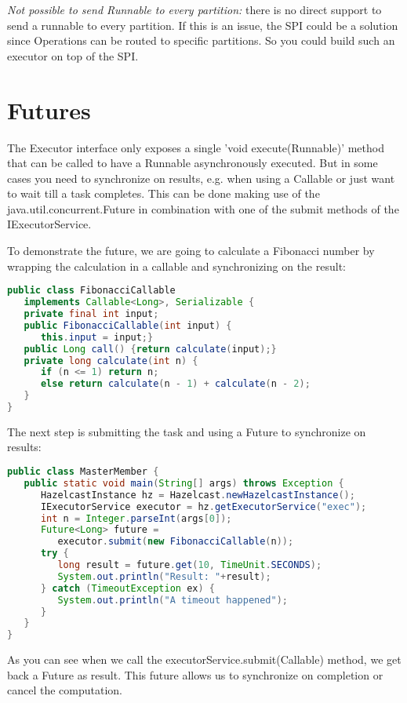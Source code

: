 \emph{Not possible to send Runnable to every partition:} there is no direct support to send a runnable to every partition. If this is an issue, the SPI could be a solution since Operations can be routed to specific partitions. So you could build such an executor on top of the SPI.

\section{Futures}
The  Executor interface only exposes a single 'void execute(Runnable)' method that can be called to have a Runnable asynchronously executed. But in some cases you need to synchronize on results, e.g. when using a Callable or just want to wait till a task completes. This can be done making use of the java.util.concurrent.Future in combination with one of the submit methods of the IExecutorService.

To demonstrate the future, we are going to calculate a Fibonacci number by wrapping the calculation in a callable and synchronizing on the result:
\begin{lstlisting}[language=java]
public class FibonacciCallable 
   implements Callable<Long>, Serializable {
   private final int input;
   public FibonacciCallable(int input) {
      this.input = input;}
   public Long call() {return calculate(input);}
   private long calculate(int n) {
      if (n <= 1) return n;
      else return calculate(n - 1) + calculate(n - 2);
   }
}
\end{lstlisting}
The next step is submitting the task and using a Future to synchronize on results:
\begin{lstlisting}[language=java]
public class MasterMember {
   public static void main(String[] args) throws Exception {
      HazelcastInstance hz = Hazelcast.newHazelcastInstance();
      IExecutorService executor = hz.getExecutorService("exec");
      int n = Integer.parseInt(args[0]);
      Future<Long> future = 
         executor.submit(new FibonacciCallable(n));
      try {
         long result = future.get(10, TimeUnit.SECONDS);
         System.out.println("Result: "+result);
      } catch (TimeoutException ex) {
         System.out.println("A timeout happened");
      }
   }
}
\end{lstlisting}
As you can see when we call the executorService.submit(Callable) method, we get back a Future as result. This future allows us to synchronize on completion or cancel the computation. 

